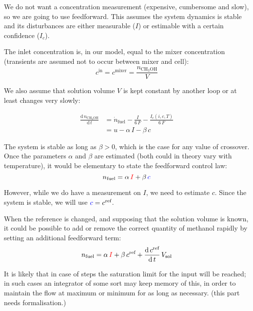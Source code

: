 \documentclass[a4paper,10pt]{article}
\newcommand{\MeOH}{\ensuremath{\mathrm{CH_3OH}}}
\newcommand{\Measurement}[1]{\textcolor{red}{#1}}
\newcommand{\Estimate}[1]{\textcolor{blue}{#1}}
\newcommand{\DER}[2]{\ensuremath{\frac{\mathrm{d}\,#1}{\mathrm{d}\,#2}}}
\begin{document}
We do not want a concentration measurement (expensive, cumbersome and slow), so
we are going to use feedforward. This assumes the system dynamics is stable and
its disturbances are either measurable ($I$) or estimable with a certain
confidence ($I_c$).

The inlet concentration is, in our model, equal to the mixer concentration
(transients are assumed not to occur between mixer and cell):
\begin{equation}
c^\text{in} = c^\text{mixer} = \frac{n_\MeOH}{V}
\end{equation}

We also assume that solution volume $V$ is kept constant by another loop or at
least changes very slowly:

\begin{equation}
\begin{aligned}
\DER{n_\MeOH}{t} & = \dot n_\text{fuel} - \frac{I}{6\,F}
- \frac{I_c(i,c,T)}{6\,F}\\
& = u - \alpha\,I - \beta\,c
\end{aligned}
\end{equation}

The system is stable as long as $\beta>0$, which is the case for any value of
crossover. Once the parameters $\alpha$ and $\beta$ are estimated (both could
in theory vary with temperature), it would be elementary to state the
feedforward control law:
\begin{equation}
n_\text{fuel} = \alpha\,\Measurement{I} + \beta\,\Estimate{c}
\end{equation}

However, while we do have a measurement on $I$, we need to estimate $c$. Since
the system is stable, we will use $\Estimate{c} = c^\text{ref}$.

When the reference is changed, and supposing that the solution volume is known,
it could be possible to add or remove the correct quantity of methanol rapidly
by setting an additional feedforward term:
\begin{equation}
n_\text{fuel} = \alpha\,\Measurement{I} + \beta\,c^\text{ref} +
\DER{c^\text{ref}}{t}\,V_\text{sol}
\end{equation}

It is likely that in case of steps the saturation limit for the input will be
reached; in such cases an integrator of some sort may keep memory of this, in
order to maintain the flow at maximum or minimum for as long as necessary. (this
part needs formalisation.)
\end{document}
